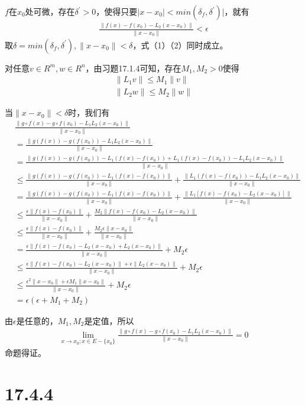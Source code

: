 \documentclass{article}
\begin{document}
$f$在$x_0$处可微，存在$\delta^\prime > 0$，使得只要$|x - x_0| < min(\delta_f,\delta^\prime)|$，就有
\begin{align}
  \frac{\|f(x) - f(x_0) - L_2(x - x_0)\|}{\|x - x_0\|} < \epsilon
\end{align}
取$\delta = min(\delta_f,\delta^\prime), \|x - x_0 \| < \delta$，式（1）（2）同时成立。

对任意$v \in R^m, w \in R^n$，由习题17.1.4可知，存在$M_1, M_2 > 0$使得
\begin{align*}
  \|L_1 v\| \leq M_1 \|v\| \\
  \|L_2 w\| \leq M_2 \|w\|
\end{align*}

当$\| x - x_0 \| < \delta$时，我们有
\begin{align*}
   & \frac{\|g \circ f(x) - g \circ f(x_0) - L_1L_2(x - x_0)\|}{\|x - x_0\|}                                                              \\
   & = \frac{\|g(f(x)) - g(f(x_0)) - L_1L_2(x - x_0)\|}{\|x - x_0\|}                                                                      \\
   & = \frac{\|g(f(x)) - g(f(x_0)) - L_1(f(x) - f(x_0)) + L_1(f(x) - f(x_0)) - L_1L_2(x - x_0)\|}{\|x - x_0\|}                            \\
   & \leq \frac{\|g(f(x)) - g(f(x_0)) - L_1(f(x) - f(x_0))\|}{\|x - x_0\|} + \frac{\|L_1(f(x) - f(x_0)) - L_1L_2(x - x_0)\|}{\|x - x_0\|} \\
   & = \frac{\|g(f(x)) - g(f(x_0)) - L_1(f(x) - f(x_0))\|}{\|x - x_0\|} + \frac{\|L_1[f(x) - f(x_0) - L_2(x - x_0)]\|}{\|x - x_0\|}       \\
   & \leq \frac{\epsilon \|f(x) - f(x_0)\|}{\|x - x_0\|} + \frac{M_2\|f(x) - f(x_0) - L_2(x - x_0)\|}{\|x - x_0\|}                        \\
   & \leq \frac{\epsilon \|f(x) - f(x_0)\|}{\|x - x_0\|} + \frac{M_2\epsilon \|x - x_0\|}{\|x - x_0\|}                                    \\
   & = \frac{\epsilon \|f(x) - f(x_0) - L_2(x - x_0) + L_2(x - x_0)\|}{\|x - x_0\|} + M_2\epsilon                                         \\
   & \leq \frac{\epsilon \|f(x) - f(x_0) - L_2(x - x_0)\| + \epsilon\|L_2(x - x_0)\|}{\|x - x_0\|} + M_2\epsilon                          \\
   & \leq \frac{\epsilon^2\|x - x_0\| + \epsilon M_1\|x - x_0\|}{\|x - x_0\|} + M_2\epsilon                                               \\
   & = \epsilon(\epsilon + M_1 + M_2)
\end{align*}

由$\epsilon$是任意的，$M_1, M_2$是定值，所以
\begin{align*}
  \lim_{x \to x_0; x \in E - \{x_0\}} \frac{\|g \circ f(x) - g \circ f(x_0) - L_1L_2(x - x_0)\|}{\|x - x_0\|} = 0
\end{align*}
命题得证。

\section*{17.4.4}
\end{document}
